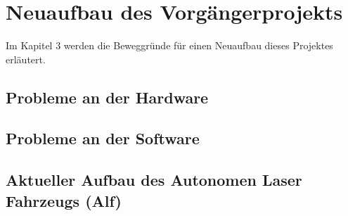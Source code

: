 

\chapter{Neuaufbau des Vorgängerprojekts}

Im Kapitel 3 werden die Beweggründe für einen Neuaufbau dieses Projektes erläutert.

\section{Probleme an der Hardware}




\section{Probleme an der Software}

\section{Aktueller Aufbau des Autonomen Laser Fahrzeugs (Alf)}
